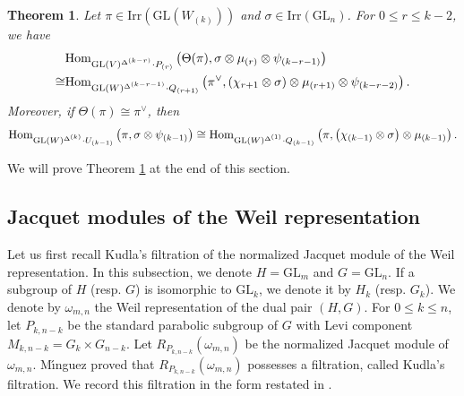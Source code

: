 \documentclass[11pt,reqno]{amsart}
\renewcommand{\1}{{\mathbf{1}}} \newcommand{\sB}{{\mathscr{B}}}
\newcommand{\GL}{{\mathrm{GL}}}\newcommand{\G}{{\mathrm{G}}}
\newcommand{\Irr}{{\mathrm{Irr}}} \newcommand{\cInd}{{\mathrm{c-Ind}}}
\theoremstyle{plain}
\newtheorem{thm}{Theorem}[section] \newtheorem{cor}[thm]{Corollary}
\theoremstyle{definition}
\numberwithin{equation}{section}
\begin{document}
\begin{thm}\label{thm2} Let $\pi\in\Irr(\GL(W_{(k)}))$ and $\sigma\in\Irr(\GL_n)$. For $0\leq r\leq k-2$, we have
$$\begin{aligned}&\Hom_{\GL(V)^{\Delta^{(k-r)}}\cdot P_{(r)}}\left(\Theta(\pi),\sigma\otimes\mu_{(r)}\otimes\psi_{(k-r-1)}\right) \\\cong&\Hom_{\GL(W)^{\Delta^{(k-r-1)}}\cdot Q_{(r+1)}}\left(\pi^\vee,\left(\chi_{r+1}\otimes\sigma\right)\otimes\mu_{(r+1)}\otimes\psi_{(k-r-2)}\right).\end{aligned}$$
Moreover, if $\Theta(\pi)\cong\pi^\vee$, then
$$\Hom_{\GL(W)^{\Delta^{(k)}}\cdot U_{(k-1)}}\left(\pi,\sigma\otimes\psi_{(k-1)}\right)\cong\Hom_{\GL(W)^{\Delta^{(1)}}\cdot Q_{(k-1)}}\left(\pi,\left(\chi_{(k-1)}\otimes\sigma\right)\otimes\mu_{(k-1)}\right).$$ 
\end{thm}
We will prove Theorem \ref{thm2} at the end of this section.

\subsection{Jacquet modules of the Weil representation}
Let us first recall Kudla's filtration of the normalized Jacquet module of the Weil representation. In this subsection, we denote $H=\GL_m$ and $G=\GL_n$. If a subgroup of $H$ (resp. $G$) is isomorphic to $\GL_k$, we denote it by $H_k$ (resp. $G_k$).  We denote by $\omega_{m,n}$ the Weil representation of the dual pair $(H,G)$. For $0\leq k\leq n$, let $P_{k,n-k}$ be the standard parabolic subgroup of $G$ with Levi component $M_{k,n-k}=G_k\times G_{n-k}$. Let $R_{P_{k,n-k}}(\omega_{m,n})$ be the normalized Jacquet module of $\omega_{m,n}$. M\'{\i}nguez \cite[Proposition 3.2]{min} proved that $R_{P_{k,n-k}}(\omega_{m,n})$ possesses a filtration, called  Kudla's filtration. We record this filtration in the form restated in \cite[Proposition 3.4]{chen}.
\end{document}
